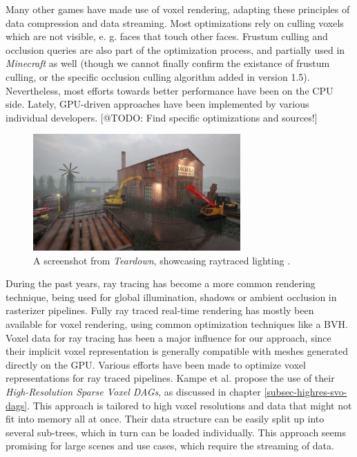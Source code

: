 \noindent
Many other games have made use of voxel rendering, adapting these principles of data compression and data streaming. 
Most optimizations rely on culling voxels which are not visible, e. g. faces that touch other faces.
Frustum culling and occlusion queries are also part of the optimization process, and partially used in \emph{Minecraft} 
as well (though we cannot finally confirm the existance of frustum culling, or the specific occlusion culling 
algorithm added in version 1.5). Nevertheless, most efforts towards better performance have been on the \ac{CPU} side.
Lately, \ac{GPU}-driven approaches have been implemented by various individual developers. [@TODO: Find specific 
optimizations and sources!]  \\

\begin{figure}[h]
    \centering
    \includegraphics[width=300px]{images/graphics/teardown-ray-tracing.jpg}
    \caption{A screenshot from \emph{Teardown}, showcasing raytraced lighting \cite{TeardownSteam2022}.}
    \label{fig:teardown-raytracing}
\end{figure}

\noindent
During the past years, ray tracing has become a more common rendering technique, being used for global illumination, 
shadows or ambient occlusion in rasterizer pipelines. Fully ray traced real-time rendering has mostly been available 
for voxel rendering, using common optimization techniques like a \ac{BVH}. Voxel data for ray tracing has been a 
major influence for our approach, since their implicit voxel representation is generally compatible with meshes 
generated directly on the \ac{GPU}. Various efforts have been made to optimize voxel representations for ray traced 
pipelines. Kampe et al. \cite{Kampe2013} propose the use of their \emph{High-Resolution Sparse Voxel \ac{DAG}s}, 
as discussed in chapter \ref{subsec-highres-svo-dags}. This approach is tailored to high voxel resolutions and data 
that might not fit into memory all at once. Their data structure can be easily split up into several sub-trees, which 
in turn can be loaded individually. This approach seems promising for large scenes and use cases, which require the 
streaming of data. 


